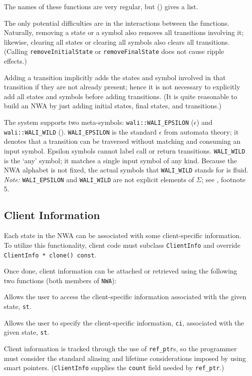 The names of these functions are very regular, but
 () gives a list.

The only potential difficulties are in the interactions between the
functions. Naturally, removing a state or a symbol also removes all
transitions involving it; likewise, clearing all states or clearing all symbols
also clears all transitions. (Calling \texttt{removeInitialState} or \texttt{removeFinalState}
does not cause ripple effects.)

Adding a transition implicitly adds the states and symbol involved in that
transition if they are not already present; hence it is not necessary to
explicitly add all states and symbols before adding transitions. (It is quite
reasonable to build an NWA by just adding initial states, final states, and
transitions.)


The system supports two meta-symbols: \texttt{wali::WALI\_EPSILON}
(\texttt{$\epsilon$}) and \texttt{wali::WALI\_WILD} (\texttt{\wild}).
\texttt{WALI\_EPSILON} is the standard $\epsilon$ from automata theory; it
denotes that a transition can be traversed without matching
and consuming an input symbol.  Epsilon symbols cannot label call or return
transitions. \texttt{WALI\_WILD} is the `any' symbol; it matches a single input
symbol of any kind.  Because the NWA alphabet is not fixed, the actual symbols
that \texttt{WALI\_WILD} stands for is fluid.  \textsl{Note:}
\texttt{WALI\_EPSILON} and \texttt{WALI\_WILD} are not explicit
elements of $\Sigma$; see , footnote 5.



\subsection{Client Information}
\label{Se:client-info}

Each state in the NWA can be associated with some client-specific
information. To utilize this functionality, client code must subclass
\texttt{ClientInfo} and override \texttt{ClientInfo * clone() const}.

Once done, client information can be attached or retrieved using the
following two functions (both members of \texttt{NWA}):
\begin{functionlist}
    Allows the user to access the client-specific information associated with
    the given state, \texttt{st}.

    Allows the user to specify the client-specific information, \texttt{ci},
    associated with the given state, \texttt{st}. \\
\end{functionlist}
Client information is tracked through the use of \texttt{ref\_ptr}s, so the
programmer must consider the standard aliasing and lifetime considerations
imposed by using smart pointers. (\texttt{ClientInfo} supplies the
\texttt{count} field needed by \texttt{ref\_ptr}.)

